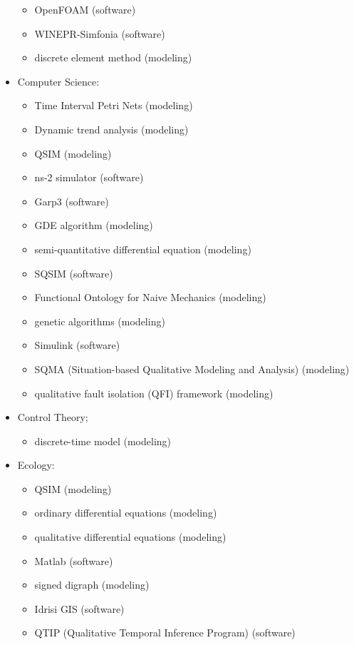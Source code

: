 \documentclass[utf8]{gradu3}
\begin{document}
\begin{itemize}
\begin{itemize}
        \item OpenFOAM (software)
        \item WINEPR-Simfonia (software)
        \item discrete element method (modeling)
    \end{itemize}
    \item Computer Science:
    \begin{itemize}
        \item Time Interval Petri Nets (modeling)
        \item Dynamic trend analysis (modeling)
        \item QSIM (modeling)
        \item ns-2 simulator (software)
        \item Garp3 (software)
        \item GDE algorithm (modeling)
        \item semi-quantitative differential equation (modeling)
        \item SQSIM (software)
        \item Functional Ontology for Naive Mechanics (modeling)
        \item genetic algorithms (modeling)
        \item Simulink (software)
        \item SQMA (Situation-based Qualitative Modeling and Analysis) (modeling)
        \item qualitative fault isolation (QFI) framework (modeling)
    \end{itemize}
    \item Control Theory;
    \begin{itemize}
        \item discrete-time model (modeling)
    \end{itemize}
    \item Ecology:
    \begin{itemize}
        \item QSIM (modeling)
        \item ordinary differential equations (modeling)
        \item qualitative differential equations (modeling)
        \item Matlab (software)
        \item signed digraph (modeling)
        \item Idrisi GIS (software)
        \item QTIP (Qualitative Temporal Inference Program) (software)

\end{itemize}
\end{itemize}
\end{document}
